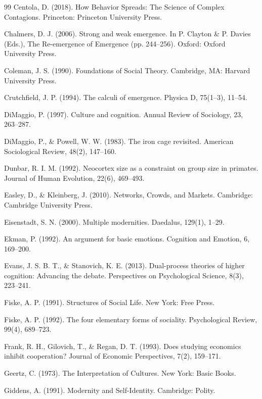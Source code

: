 \documentclass[12pt,a4paper]{article}
\begin{document}
\begin{thebibliography}{99}
 Centola, D. (2018). How Behavior Spreads: The Science of Complex Contagions. Princeton: Princeton University Press.

 Chalmers, D. J. (2006). Strong and weak emergence. In P. Clayton \& P. Davies (Eds.), The Re-emergence of Emergence (pp. 244--256). Oxford: Oxford University Press.

 Coleman, J. S. (1990). Foundations of Social Theory. Cambridge, MA: Harvard University Press.

 Crutchfield, J. P. (1994). The calculi of emergence. Physica D, 75(1--3), 11--54.

 DiMaggio, P. (1997). Culture and cognition. Annual Review of Sociology, 23, 263--287.

 DiMaggio, P., \& Powell, W. W. (1983). The iron cage revisited. American Sociological Review, 48(2), 147--160.

 Dunbar, R. I. M. (1992). Neocortex size as a constraint on group size in primates. Journal of Human Evolution, 22(6), 469--493.

 Easley, D., \& Kleinberg, J. (2010). Networks, Crowds, and Markets. Cambridge: Cambridge University Press.

 Eisenstadt, S. N. (2000). Multiple modernities. Daedalus, 129(1), 1--29.

 Ekman, P. (1992). An argument for basic emotions. Cognition and Emotion, 6, 169--200.

 Evans, J. S. B. T., \& Stanovich, K. E. (2013). Dual-process theories of higher cognition: Advancing the debate. Perspectives on Psychological Science, 8(3), 223--241.

 Fiske, A. P. (1991). Structures of Social Life. New York: Free Press.

 Fiske, A. P. (1992). The four elementary forms of sociality. Psychological Review, 99(4), 689--723.

 Frank, R. H., Gilovich, T., \& Regan, D. T. (1993). Does studying economics inhibit cooperation? Journal of Economic Perspectives, 7(2), 159--171.

 Geertz, C. (1973). The Interpretation of Cultures. New York: Basic Books.

 Giddens, A. (1991). Modernity and Self-Identity. Cambridge: Polity.


\end{thebibliography}
\end{document}
